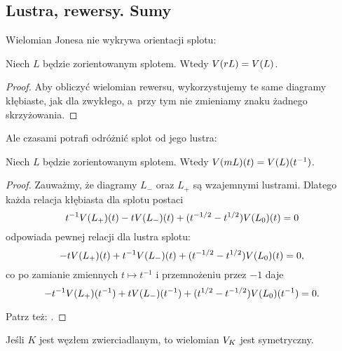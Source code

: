 
\subsection{Lustra, rewersy. Sumy}
Wielomian Jonesa nie wykrywa orientacji splotu:

\begin{proposition}
%
    Niech $L$ będzie zorientowanym splotem.
    Wtedy $V(rL)=V(L)$.
\end{proposition}

\begin{proof}
    Aby obliczyć wielomian rewersu, wykorzystujemy te same diagramy kłębiaste,
    jak dla zwykłego, a~przy tym nie zmieniamy znaku żadnego skrzyżowania.
\end{proof}

Ale czasami potrafi odróżnić splot od jego lustra:

\begin{proposition}
%
    Niech $L$ będzie zorientowanym splotem.
    Wtedy $V(mL)(t)=V(L)(t^{-1})$.
\end{proposition}

\begin{proof}
    Zauważmy, że diagramy $L_-$ oraz $L_+$ są wzajemnymi lustrami.
    Dlatego każda relacja kłębiasta dla splotu postaci
    \begin{equation}
        t^{-1} V(L_+)(t) - tV(L_-)(t) + (t^{-1/2} - t^{1/2}) V(L_0)(t) = 0
    \end{equation}
    odpowiada pewnej relacji dla lustra splotu:
    \begin{equation}
        -tV(L_+)(t) + t^{-1} V(L_-)(t) + (t^{-1/2} - t^{1/2}) V(L_0)(t) = 0,
    \end{equation}
    co po zamianie zmiennych $t \mapsto t^{-1}$ i przemnożeniu przez $-1$ daje
    \begin{equation}
        -t^{-1} V(L_+)(t^{-1}) + t V(L_-)(t^{-1}) + (t^{1/2} - t^{-1/2}) V(L_0)(t^{-1}) = 0.
    \end{equation}

    Patrz też: \cite[s. 12]{gellert09}.
\end{proof}

\begin{corollary}
%
\label{cor:joines_of_amphicheiral}%
    Jeśli $K$ jest węzłem zwierciadlanym, to wielomian $V_K$ jest symetryczny.
\end{corollary}

